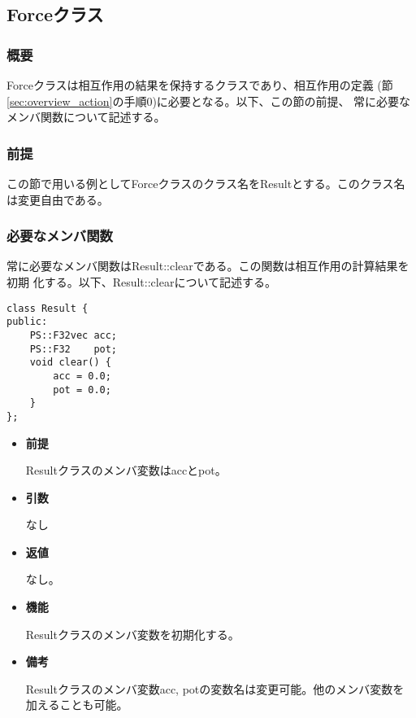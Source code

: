 \subsection{Forceクラス}
\label{sec:example_force}

\subsubsection{概要}

Forceクラスは相互作用の結果を保持するクラスであり、相互作用の定義
(節\ref{sec:overview_action}の手順0)に必要となる。以下、この節の前提、
常に必要なメンバ関数について記述する。

\subsubsection{前提}

この節で用いる例としてForceクラスのクラス名をResultとする。このクラス名
は変更自由である。

\subsubsection{必要なメンバ関数}

常に必要なメンバ関数はResult::clearである。この関数は相互作用の計算結果を初期
化する。以下、Result::clearについて記述する。


\begin{screen}
\begin{verbatim}
class Result {
public:
    PS::F32vec acc;
    PS::F32    pot;
    void clear() {
        acc = 0.0;
        pot = 0.0;
    }
};
\end{verbatim}
\end{screen}

\begin{itemize}

\item {\bf 前提}
  
  Resultクラスのメンバ変数はaccとpot。
  
\item {\bf 引数}

  なし
  
\item {\bf 返値}

  なし。
  
\item {\bf 機能}

  Resultクラスのメンバ変数を初期化する。
  
\item {\bf 備考}

  Resultクラスのメンバ変数acc, potの変数名は変更可能。他のメンバ変数を
  加えることも可能。

\end{itemize}

